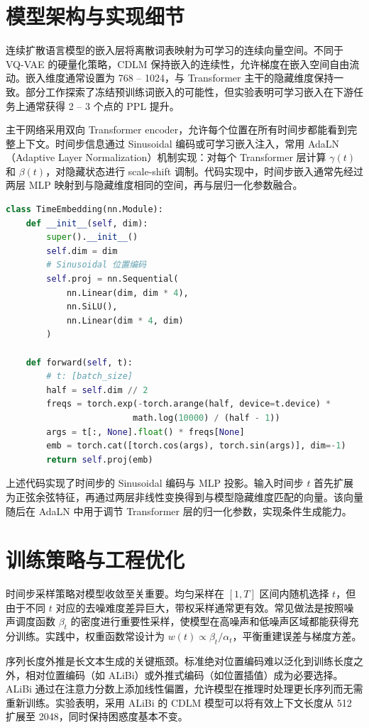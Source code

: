\chapter{模型架构与实现细节}
连续扩散语言模型的嵌入层将离散词表映射为可学习的连续向量空间。不同于 VQ-VAE 的硬量化策略，CDLM 保持嵌入的连续性，允许梯度在嵌入空间自由流动。嵌入维度通常设置为 768 – 1024，与 Transformer 主干的隐藏维度保持一致。部分工作探索了冻结预训练词嵌入的可能性，但实验表明可学习嵌入在下游任务上通常获得 2 – 3 个点的 PPL 提升。\par
主干网络采用双向 Transformer encoder，允许每个位置在所有时间步都能看到完整上下文。时间步信息通过 Sinusoidal 编码或可学习嵌入注入，常用 AdaLN（Adaptive Layer Normalization）机制实现：对每个 Transformer 层计算 $\gamma(t)$ 和 $\beta(t)$，对隐藏状态进行 scale-shift 调制。代码实现中，时间步嵌入通常先经过两层 MLP 映射到与隐藏维度相同的空间，再与层归一化参数融合。\par
\begin{lstlisting}[language=python]
class TimeEmbedding(nn.Module):
    def __init__(self, dim):
        super().__init__()
        self.dim = dim
        # Sinusoidal 位置编码
        self.proj = nn.Sequential(
            nn.Linear(dim, dim * 4),
            nn.SiLU(),
            nn.Linear(dim * 4, dim)
        )
    
    def forward(self, t):
        # t: [batch_size]
        half = self.dim // 2
        freqs = torch.exp(-torch.arange(half, device=t.device) * 
                         math.log(10000) / (half - 1))
        args = t[:, None].float() * freqs[None]
        emb = torch.cat([torch.cos(args), torch.sin(args)], dim=-1)
        return self.proj(emb)
\end{lstlisting}
上述代码实现了时间步的 Sinusoidal 编码与 MLP 投影。输入时间步 $t$ 首先扩展为正弦余弦特征，再通过两层非线性变换得到与模型隐藏维度匹配的向量。该向量随后在 AdaLN 中用于调节 Transformer 层的归一化参数，实现条件生成能力。\par
\chapter{训练策略与工程优化}
时间步采样策略对模型收敛至关重要。均匀采样在 $[1,T]$ 区间内随机选择 $t$，但由于不同 $t$ 对应的去噪难度差异巨大，带权采样通常更有效。常见做法是按照噪声调度函数 $\beta_t$ 的密度进行重要性采样，使模型在高噪声和低噪声区域都能获得充分训练。实践中，权重函数常设计为 $w(t) \propto \beta_t / \alpha_t$，平衡重建误差与梯度方差。\par
序列长度外推是长文本生成的关键瓶颈。标准绝对位置编码难以泛化到训练长度之外，相对位置编码（如 ALiBi）或外推式编码（如位置插值）成为必要选择。ALiBi 通过在注意力分数上添加线性偏置，允许模型在推理时处理更长序列而无需重新训练。实验表明，采用 ALiBi 的 CDLM 模型可以将有效上下文长度从 512 扩展至 2048，同时保持困惑度基本不变。\par
